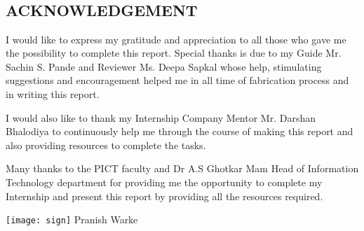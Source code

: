 \documentclass[a4paper, 12pt]{article}
\begin{document}
\newpage
\begin{titlepage}


\begin{center}
\section*{\\ACKNOWLEDGEMENT}  
\vspace{30pt}
\end{center}

\large
\hspace{0.5cm}
I would like to express my gratitude and appreciation to all those who
gave me the possibility to complete this report. Special thanks is due to my
Guide Mr. Sachin S. Pande and Reviewer Ms. Deepa Sapkal whose help, stimulating suggestions
and encouragement helped me in all time of fabrication process and in writing
this report. 
\par
\vspace{0.25cm} I would also like to thank my Internship Company Mentor Mr. Darshan Bhalodiya
to continuously help me through the course of making this report
and also providing resources to complete the tasks.
\par
Many thanks to the PICT faculty and Dr A.S Ghotkar Mam Head of Information Technology department for providing me the opportunity to complete my Internship and present this report by providing all the resources required. 
\vspace{0.25cm}
\par 
\linebreak
\vspace{5cm}
\begin{flushright}
\texttt{[image: sign]} \linebreak 
Pranish Warke
\end{flushright}\end{titlepage}

\newpage
\tableofcontents

\newpage
\listoffigures
\newpage
\end{document}

